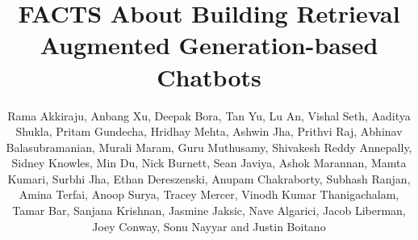 \documentclass[sigconf]{acmart}
\begin{document}
\renewcommand\footnotetextcopyrightpermission[1]{} %
\pagestyle{plain} %

\title{FACTS About Building Retrieval Augmented Generation-based Chatbots}

   \author{Rama Akkiraju, Anbang Xu, Deepak Bora, Tan Yu, Lu An, Vishal Seth, Aaditya Shukla, Pritam Gundecha, Hridhay Mehta, Ashwin Jha, Prithvi Raj, Abhinav Balasubramanian, Murali Maram, Guru Muthusamy, Shivakesh Reddy Annepally, Sidney Knowles, Min Du, Nick Burnett, Sean Javiya, Ashok Marannan, Mamta Kumari, Surbhi Jha, Ethan Dereszenski, Anupam Chakraborty, Subhash Ranjan, Amina Terfai, Anoop Surya, Tracey Mercer, Vinodh Kumar Thanigachalam, Tamar Bar, Sanjana Krishnan, Jasmine Jaksic, Nave Algarici, Jacob Liberman, Joey Conway, Sonu Nayyar and Justin Boitano} 
\end{document}
